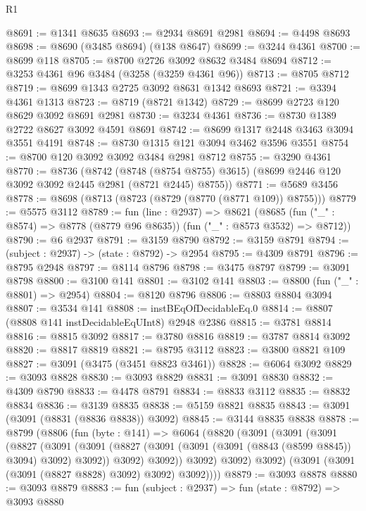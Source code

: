 \begin{lexlean}{R1}
\begin{coremodule}
@8691 := @1341 @8635
@8693 := @2934 @8691 @2981
@8694 := @4498 @8693
@8698 := @8690 (@3485 @8694) (@138 @8647)
@8699 := @3244 @4361
@8700 := @8699 @118
@8705 := @8700 @2726 @3092 @8632 @3484 @8694
@8712 := @3253 @4361 @96 @3484 (@3258 (@3259 @4361 @96))
@8713 := @8705 @8712
@8719 := @8699 @1343 @2725 @3092 @8631 @1342 @8693
@8721 := @3394 @4361 @1313
@8723 := @8719 (@8721 @1342)
@8729 := @8699 @2723 @120 @8629 @3092 @8691 @2981
@8730 := @3234 @4361
@8736 := @8730 @1389 @2722 @8627 @3092 @4591 @8691
@8742 := @8699 @1317 @2448 @3463 @3094 @3551 @4191
@8748 := @8730 @1315 @121 @3094 @3462 @3596 @3551
@8754 := @8700 @120 @3092 @3092 @3484 @2981 @8712
@8755 := @3290 @4361
@8770 := @8736
    (@8742
      (@8748 (@8754 @8755) @3615)
      (@8699 @2446 @120 @3092 @3092 @2445 @2981 (@8721 @2445) @8755))
@8771 := @5689 @3456
@8778 := @8698 (@8713 (@8723 (@8729 (@8770 (@8771 @109)) @8755)))
@8779 := @5575 @3112
@8789 := fun (line : @2937) =>
  @8621 (@8685 (fun ("_" : @8574) => @8778 (@8779 @96 @8635)) (fun ("_" : @8573 @3532) => @8712))
@8790 := @6 @2937
@8791 := @3159 @8790
@8792 := @3159 @8791
@8794 := (subject : @2937) -> (state : @8792) -> @2954
@8795 := @4309 @8791
@8796 := @8795 @2948
@8797 := @8114 @8796
@8798 := @3475 @8797
@8799 := @3091 @8798
@8800 := @3100 @141
@8801 := @3102 @141
@8803 := @8800 (fun ("_" : @8801) => @2954)
@8804 := @8120 @8796
@8806 := @8803 @8804 @3094
@8807 := @3534 @141
@8808 := instBEqOfDecidableEq.{0}
@8814 := @8807 (@8808 @141 instDecidableEqUInt8) @2948 @2386
@8815 := @3781 @8814
@8816 := @8815 @3092
@8817 := @3780 @8816
@8819 := @3787 @8814 @3092
@8820 := @8817 @8819
@8821 := @8795 @3112
@8823 := @3800 @8821 @109
@8827 := @3091 (@3475 (@3451 @8823 @3461))
@8828 := @6064 @3092
@8829 := @3093 @8828
@8830 := @3093 @8829
@8831 := @3091 @8830
@8832 := @4309 @8790
@8833 := @4478 @8791
@8834 := @8833 @3112
@8835 := @8832 @8834
@8836 := @3139 @8835
@8838 := @5159 @8821 @8835
@8843 := @3091 (@3091 (@8831 (@8836 @8838)) @3092)
@8845 := @3144 @8835 @8838
@8878 := @8799
    (@8806
      (fun (byte : @141) =>
      @6064
        (@8820
          (@3091
            (@3091
              (@3091
                (@8827
                  (@3091
                    (@3091
                      (@8827 (@3091 (@3091 (@3091 (@8843 (@8599 @8845)) @3094) @3092) @3092))
                      @3092)
                    @3092))
                @3092)
              @3092)
            @3092)
          (@3091 (@3091 (@3091 (@8827 @8828) @3092) @3092) @3092))))
@8879 := @3093 @8878
@8880 := @3093 @8879
@8883 := fun (subject : @2937) => fun (state : @8792) => @3093 @8880

\end{coremodule}
\end{lexlean}
